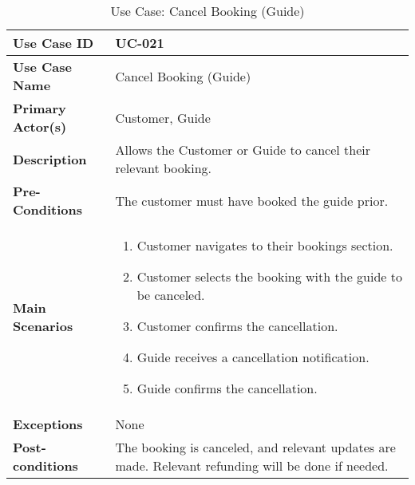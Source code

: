 \begin{table}[ht]
    \centering
    \begin{tabular}{|l|p{}|}
        \hline
        \textbf{Use Case ID} & UC-021 \\
        \hline
        \textbf{Use Case Name} & Cancel Booking (Guide) \\
        \hline
        \textbf{Primary Actor(s)} & Customer, Guide \\
        \hline
        \textbf{Description} & Allows the Customer or Guide to cancel their relevant booking. \\
        \hline
        \textbf{Pre-Conditions} & The customer must have booked the guide prior. \\
        \hline
        \textbf{Main Scenarios} & 
        \begin{enumerate}[label=\arabic*.,itemsep=0pt]
            \item Customer navigates to their bookings section.
            \item Customer selects the booking with the guide to be canceled.
            \item Customer confirms the cancellation.
            \item Guide receives a cancellation notification.
            \item Guide confirms the cancellation.
        \end{enumerate} \\
        \hline
        \textbf{Exceptions} & None \\
        \hline
        \textbf{Post-conditions} & The booking is canceled, and relevant updates are made. Relevant refunding will be done if needed. \\
        \hline
    \end{tabular}
    \label{tab:use-case-cancel-hire-guide}
    \caption{Use Case: Cancel Booking (Guide)}
\end{table}


